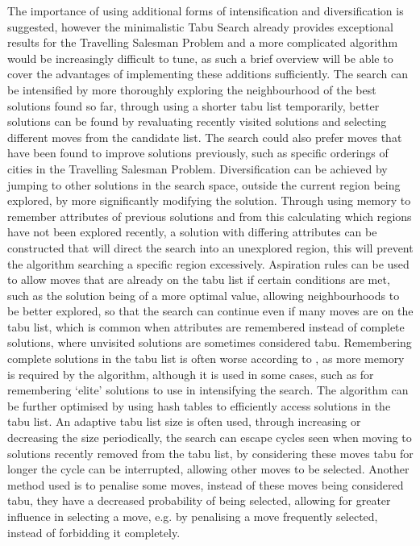 \documentclass[]{final_report}
\begin{document}
The importance of using additional forms of intensification and diversification is suggested\cite{siarry:2016}, however the minimalistic Tabu Search already provides exceptional results for the Travelling Salesman Problem and a more complicated algorithm would be increasingly difficult to tune, as such a brief overview will be able to cover the advantages of implementing these additions sufficiently. The search can be intensified by more thoroughly exploring the neighbourhood of the best solutions found so far, through using a shorter tabu list temporarily, better solutions can be found by revaluating recently visited solutions and selecting different moves from the candidate list. The search could also prefer moves that have been found to improve solutions previously, such as specific orderings of cities in the Travelling Salesman Problem. Diversification can be achieved by jumping to other solutions in the search space, outside the current region being explored, by more significantly modifying the solution. Through using memory to remember attributes of previous solutions and from this calculating which regions have not been explored recently, a solution with differing attributes can be constructed that will direct the search into an unexplored region, this will prevent the algorithm searching a specific region excessively. Aspiration rules can be used to allow moves that are already on the tabu list if certain conditions are met, such as the solution being of a more optimal value, allowing neighbourhoods to be better explored, so that the search can continue even if many moves are on the tabu list\cite{siarry:2016}, which is common when attributes are remembered instead of complete solutions, where unvisited solutions are sometimes considered tabu. Remembering complete solutions in the tabu list is often worse according to \cite{glover:1999}, as more memory is required by the algorithm, although it is used in some cases, such as for remembering `elite' solutions to use in intensifying the search. The algorithm can be further optimised by using hash tables to efficiently access solutions in the tabu list. An adaptive tabu list size is often used, through increasing or decreasing the size periodically, the search can escape cycles seen when moving to solutions recently removed from the tabu list, by considering these moves tabu for longer the cycle can be interrupted, allowing other moves to be selected\cite{siarry:2016}. Another method used is to penalise some moves, instead of these moves being considered tabu, they have a decreased probability of being selected, allowing for greater influence in selecting a move, e.g. by penalising a move frequently selected, instead of forbidding it completely\cite{siarry:2016}.
\end{document}

